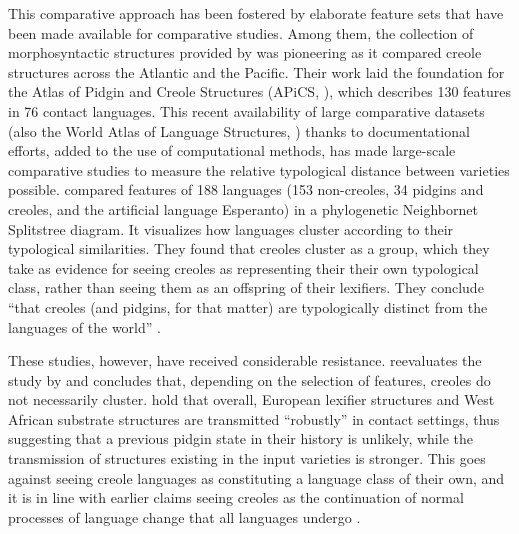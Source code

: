 \documentclass[output=paper,
modfonts
]{langscibook}
\begin{document}
This comparative approach has been fostered by elaborate feature sets that have been made available for comparative studies. Among them, the collection of morphosyntactic structures provided by \cite{holmetal2007} was pioneering as it compared creole structures across the Atlantic and the Pacific. Their work laid the foundation for the Atlas of Pidgin and Creole Structures (APiCS, \citealt{apics}), which describes 130 features in 76 contact languages. This recent availability of large comparative datasets (also the World Atlas of Language Structures, \citealt{wals}) thanks to documentational efforts, added to the use of computational methods, has made large-scale comparative studies to measure the relative typological distance between varieties possible. \cite{bakkeretal2013creoles} compared features of 188 languages (153 non-creoles, 34 pidgins and creoles, and the artificial language Esperanto) in a phylogenetic Neighbornet Splitstree diagram. It visualizes how languages cluster according to their typological similarities. They found that creoles cluster as a group, which they take as evidence for seeing creoles as representing their their own typological class, rather than seeing them as an offspring of their lexifiers. They conclude “that creoles (and pidgins, for that matter) are typologically distinct from the languages of the world” \citep[39]{bakkeretal2013creoles}.

These studies, however, have received considerable resistance. \cite{fonsing2017creoles} reevaluates the study by \cite{bakkeretal2013creoles} and concludes that, depending on the selection of features, creoles do not necessarily cluster. \cite{blasietal2017grammars} hold that overall, European lexifier structures and West African substrate structures are transmitted “robustly” in contact settings, thus suggesting that a previous pidgin state in their history is unlikely, while the transmission of structures existing in the input varieties is stronger. This goes against seeing creole languages as constituting a language class of their own, and it is in line with earlier claims seeing creoles as the continuation of normal processes of language change that all languages undergo \citep[e.g.][]{mufwene2008language}.
\end{document}
